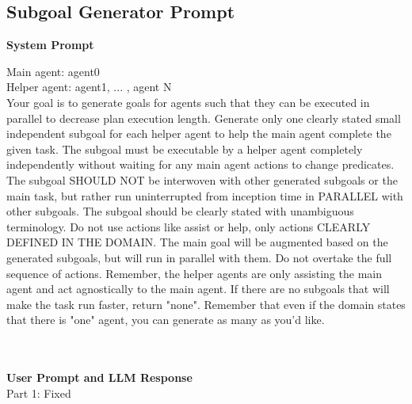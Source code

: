 \documentclass[letterpaper, 10 pt, conference]{ieeeconf}
\begin{document}
\subsection{Subgoal Generator Prompt}
\noindent \textbf{System Prompt}\\
\colorbox{blue!10}{
\begin{minipage}{0.95\columnwidth}
Main agent: agent0\\
Helper agent: agent1, ... , agent N\\
Your goal is to generate goals for agents such that they can be executed in parallel to decrease plan execution length. Generate only one clearly stated small independent subgoal for each helper agent to help the main agent complete the given task. The subgoal must be executable by a helper agent completely independently without waiting for any main agent actions to change predicates. The subgoal SHOULD NOT be interwoven with other generated subgoals or the main task, but rather run uninterrupted from inception time in PARALLEL with other subgoals.  
The subgoal should be clearly stated with unambiguous terminology. Do not use actions like assist or help, only actions CLEARLY DEFINED IN THE DOMAIN. The main goal will be augmented based on the generated subgoals, but will run in parallel with them. Do not overtake the full sequence of actions. Remember, the helper agents are only assisting the main agent and act agnostically to the main agent. If there are no subgoals that will make the task run faster, return "none". Remember that even if the domain states that there is "one" agent, you can generate as many as you'd like.
\end{minipage}
} \\ \\
\noindent \textbf{User Prompt and LLM Response}\\
Part 1: Fixed \\
\end{document}
